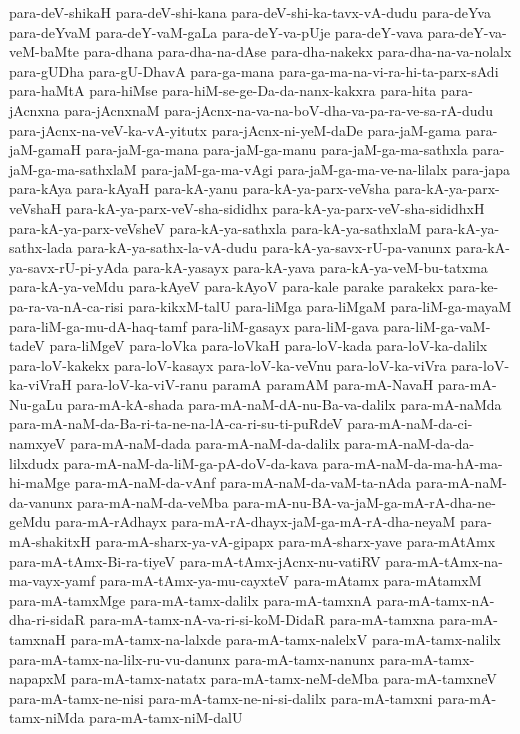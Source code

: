 {para-deV-shikaH
para-deV-shi-kana
para-deV-shi-ka-tavx-vA-dudu
para-deYva
para-deYvaM
para-deY-vaM-gaLa
para-deY-va-pUje
para-deY-vava
para-deY-va-veM-baMte
para-dhana
para-dha-na-dAse
para-dha-nakekx
para-dha-na-va-nolalx
para-gUDha
para-gU-DhavA
para-ga-mana
para-ga-ma-na-vi-ra-hi-ta-parx-sAdi
para-haMtA
para-hiMse
para-hiM-se-ge-Da-da-nanx-kakxra
para-hita
para-jAcnxna
para-jAcnxnaM
para-jAcnx-na-va-na-boV-dha-va-pa-ra-ve-sa-rA-dudu
para-jAcnx-na-veV-ka-vA-yitutx
para-jAcnx-ni-yeM-daDe
para-jaM-gama
para-jaM-gamaH
para-jaM-ga-mana
para-jaM-ga-manu
para-jaM-ga-ma-sathxla
para-jaM-ga-ma-sathxlaM
para-jaM-ga-ma-vAgi
para-jaM-ga-ma-ve-na-lilalx
para-japa
para-kAya
para-kAyaH
para-kA-yanu
para-kA-ya-parx-veVsha
para-kA-ya-parx-veVshaH
para-kA-ya-parx-veV-sha-sididhx
para-kA-ya-parx-veV-sha-sididhxH
para-kA-ya-parx-veVsheV
para-kA-ya-sathxla
para-kA-ya-sathxlaM
para-kA-ya-sathx-lada
para-kA-ya-sathx-la-vA-dudu
para-kA-ya-savx-rU-pa-vanunx
para-kA-ya-savx-rU-pi-yAda
para-kA-yasayx
para-kA-yava
para-kA-ya-veM-bu-tatxma
para-kA-ya-veMdu
para-kAyeV
para-kAyoV
para-kale
parake
parakekx
para-ke-pa-ra-va-nA-ca-risi
para-kikxM-talU
para-liMga
para-liMgaM
para-liM-ga-mayaM
para-liM-ga-mu-dA-haq-tamf
para-liM-gasayx
para-liM-gava
para-liM-ga-vaM-tadeV
para-liMgeV
para-loVka
para-loVkaH
para-loV-kada
para-loV-ka-dalilx
para-loV-kakekx
para-loV-kasayx
para-loV-ka-veVnu
para-loV-ka-viVra
para-loV-ka-viVraH
para-loV-ka-viV-ranu
paramA
paramAM
para-mA-NavaH
para-mA-Nu-gaLu
para-mA-kA-shada
para-mA-naM-dA-nu-Ba-va-dalilx
para-mA-naMda
para-mA-naM-da-Ba-ri-ta-ne-na-lA-ca-ri-su-ti-puRdeV
para-mA-naM-da-ci-namxyeV
para-mA-naM-dada
para-mA-naM-da-dalilx
para-mA-naM-da-da-lilxdudx
para-mA-naM-da-liM-ga-pA-doV-da-kava
para-mA-naM-da-ma-hA-ma-hi-maMge
para-mA-naM-da-vAnf
para-mA-naM-da-vaM-ta-nAda
para-mA-naM-da-vanunx
para-mA-naM-da-veMba
para-mA-nu-BA-va-jaM-ga-mA-rA-dha-ne-geMdu
para-mA-rAdhayx
para-mA-rA-dhayx-jaM-ga-mA-rA-dha-neyaM
para-mA-shakitxH
para-mA-sharx-ya-vA-gipapx
para-mA-sharx-yave
para-mAtAmx
para-mA-tAmx-Bi-ra-tiyeV
para-mA-tAmx-jAcnx-nu-vatiRV
para-mA-tAmx-na-ma-vayx-yamf
para-mA-tAmx-ya-mu-cayxteV
para-mAtamx
para-mAtamxM
para-mA-tamxMge
para-mA-tamx-dalilx
para-mA-tamxnA
para-mA-tamx-nA-dha-ri-sidaR
para-mA-tamx-nA-va-ri-si-koM-DidaR
para-mA-tamxna
para-mA-tamxnaH
para-mA-tamx-na-lalxde
para-mA-tamx-nalelxV
para-mA-tamx-nalilx
para-mA-tamx-na-lilx-ru-vu-danunx
para-mA-tamx-nanunx
para-mA-tamx-napapxM
para-mA-tamx-natatx
para-mA-tamx-neM-deMba
para-mA-tamxneV
para-mA-tamx-ne-nisi
para-mA-tamx-ne-ni-si-dalilx
para-mA-tamxni
para-mA-tamx-niMda
para-mA-tamx-niM-dalU
}
